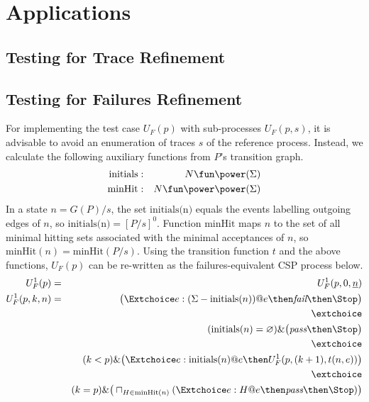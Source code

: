 \section{Applications}
\label{sec:case}




\subsection{Testing for Trace Refinement}




\subsection{Testing for Failures Refinement}

For implementing the test case $U_F(p)$ with sub-processes $U_F(p,s)$, it is
advisable to avoid an enumeration of traces $s$ of the reference process.
Instead, we calculate the following auxiliary functions from $P$'s transition
graph.
%
\begin{eqnarray*}
\text{initials} & : & N \fun \power (\Sigma)
\\
\text{minHit} & : & N \fun \power\power(\Sigma)
\end{eqnarray*}
%
In a state $n = G(P)/s$, the set $\text{initials(n)}$ equals the events
labelling outgoing edges of $n$, so  $\text{initials(n)} = [P/s]^0$. Function
$\text{minHit}$ maps $n$ to the set of all minimal hitting sets associated
with the minimal acceptances of $n$, so $\text{minHit}(n) =
\text{minHit}(P/s)$. Using the transition function $t$ and the above
functions, $U_F(p)$ can be re-written as the failures-equivalent CSP process
below.
%
\begin{eqnarray}
U_F^1(p) & = & U_F^1(p,0,\ii n)
\\
U_F^1(p,k,n) & = & \big(\Extchoice e:(\Sigma - \text{initials}(n)) @ e \then \efail\then \Stop \big)
\label{eq:xufa}
\\ & & \extchoice \nonumber
\\ & & (\text{initials}(n) = \varnothing)    \&   \big( \epass \then \Stop \big)
\label{eq:xufb}
\\ & & \extchoice \nonumber
\\ & & (k < p) \& \big(\Extchoice e:\text{initials}(n) @ e \then U_F^1(p,(k+1),t(n,e)) \big)
\label{eq:xufc}
\\ & & \extchoice \nonumber
\\ & & (k = p) \& \big( \sqcap_{H\in\text{minHit}(n)} (\Extchoice e:H @ e \then \epass \then\Stop ) \big)
\label{eq:xufd}
\end{eqnarray}

